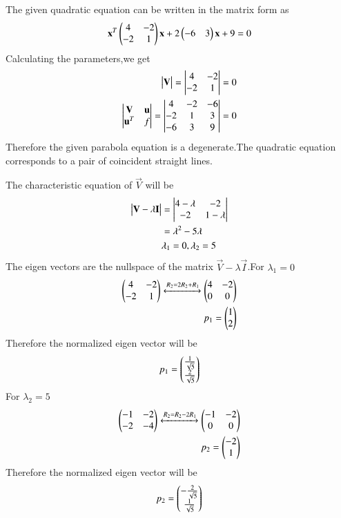 The given quadratic equation can be written in the matrix form as
\begin{align}
    \mathbf{x}^T\begin{pmatrix}4&-2\\-2&1\end{pmatrix}\mathbf{x}+2\begin{pmatrix}-6&3\end{pmatrix}\mathbf{x}+9=0\label{eq:solutions/41/9/eq:1}
\end{align}
Calculating the parameters,we get
\begin{align}
    \begin{vmatrix}\mathbf{V}\end{vmatrix}=\begin{vmatrix}4&-2\\-2&1\end{vmatrix}=0\\
    \begin{vmatrix}\mathbf{V}&\mathbf{u}\\\mathbf{u}^T&f\end{vmatrix}=\begin{vmatrix}4&-2&-6\\-2&1&3\\-6&3&9\end{vmatrix}=0
\end{align}
Therefore the given parabola equation is a degenerate.The quadratic equation corresponds to a pair of coincident straight lines.\par
The characteristic equation of $\vec{V}$ will be
\begin{align}
    \begin{vmatrix}\mathbf{V}-\lambda\mathbf{I}\end{vmatrix}&=\begin{vmatrix}4-\lambda&-2\\-2&1-\lambda\end{vmatrix}\\
    &=\lambda^2-5\lambda\\
    &\lambda_1=0,\lambda_2=5
\end{align}
The eigen vectors are the nullspace of the matrix $\vec{V}-\lambda\vec{I}$.For $\lambda_1=0$
\begin{align}
    \begin{pmatrix}4&-2\\-2&1\end{pmatrix}\xleftrightarrow{R_2=2R_2+R_1}\begin{pmatrix}4&-2\\0&0\end{pmatrix}\\
    p_1=\begin{pmatrix}1\\2\end{pmatrix}
\end{align}
Therefore the normalized eigen vector will be
\begin{align}
    p_1=\begin{pmatrix}\frac{1}{\sqrt{5}}\\\frac{2}{\sqrt{5}}\end{pmatrix}
\end{align}
For $\lambda_2=5$
\begin{align}
    \begin{pmatrix}-1&-2\\-2&-4\end{pmatrix}\xleftrightarrow{R_2=R_2-2R_1}\begin{pmatrix}-1&-2\\0&0\end{pmatrix}\\
    p_2=\begin{pmatrix}-2\\1\end{pmatrix}
\end{align}
Therefore the normalized eigen vector will be
\begin{align}
    p_2=\begin{pmatrix}-\frac{2}{\sqrt{5}}\\\frac{1}{\sqrt{5}}\end{pmatrix}
\end{align}
